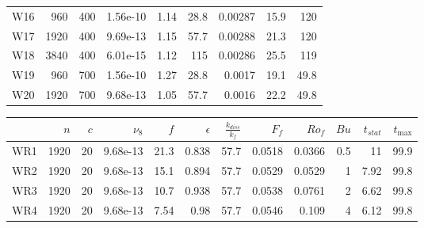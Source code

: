 \documentclass[a4paper]{article}
\begin{document}
\begin{tabular}{lrrrrrrrr}
W16 &   960 &  400 & 1.56e-10 &        1.14 &                    28.8 & 0.00287 &        15.9 &         120 \\
W17 &  1920 &  400 & 9.69e-13 &        1.15 &                    57.7 & 0.00288 &        21.3 &         120 \\
W18 &  3840 &  400 & 6.01e-15 &        1.12 &                     115 & 0.00286 &        25.5 &         119 \\
W19 &   960 &  700 & 1.56e-10 &        1.27 &                    28.8 &  0.0017 &        19.1 &        49.8 \\
W20 &  1920 &  700 & 9.68e-13 &        1.05 &                    57.7 &  0.0016 &        22.2 &        49.8 \\
\bottomrule
\end{tabular}
\begin{tabular}{lrrrrrrrrrrr}
\toprule
{} &   $n$ &  $c$ &  $\nu_8$ &  $f$ &  $\epsilon$ &  $\frac{k_{diss}}{k_f}$ &  $F_f$ &  $Ro_f$ &  $Bu$ &  $t_{stat}$ &  $t_{\max}$ \\
\midrule
WR1 &  1920 &   20 & 9.68e-13 & 21.3 &       0.838 &                    57.7 & 0.0518 &  0.0366 &   0.5 &          11 &        99.9 \\
WR2 &  1920 &   20 & 9.68e-13 & 15.1 &       0.894 &                    57.7 & 0.0529 &  0.0529 &     1 &        7.92 &        99.8 \\
WR3 &  1920 &   20 & 9.68e-13 & 10.7 &       0.938 &                    57.7 & 0.0538 &  0.0761 &     2 &        6.62 &        99.8 \\
WR4 &  1920 &   20 & 9.68e-13 & 7.54 &        0.98 &                    57.7 & 0.0546 &   0.109 &     4 &        6.12 &        99.8 \\
\bottomrule
\end{tabular}
\end{document}
